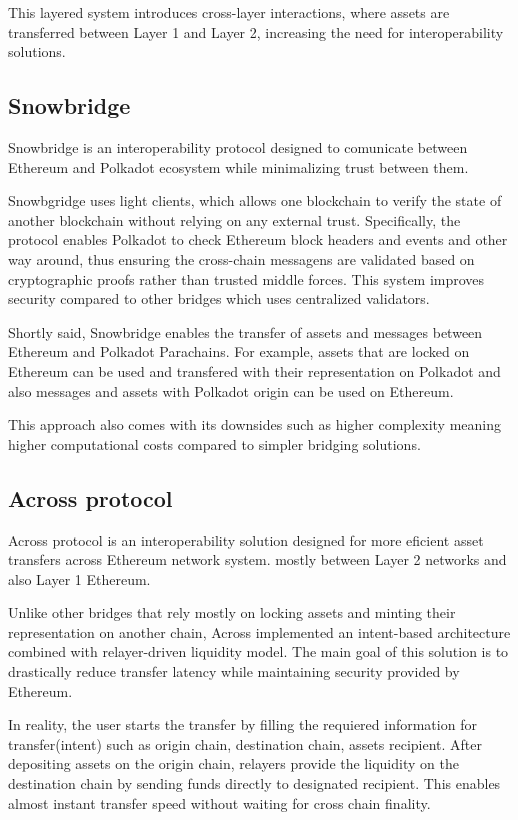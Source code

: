 \documentclass[conference]{IEEEtran}
\begin{document}
This layered system introduces cross-layer interactions, where assets are transferred between Layer 1 and Layer 2, increasing the need for interoperability solutions.
\subsection{Snowbridge}

Snowbridge is an interoperability protocol designed to comunicate between Ethereum and Polkadot ecosystem while minimalizing trust between them. 

Snowbgridge uses light clients, which allows one blockchain to verify the state of another blockchain without relying on any external trust. Specifically, the protocol enables Polkadot to check Ethereum block headers and events and other way around, thus ensuring the cross-chain messagens are validated based on cryptographic proofs rather than trusted middle forces. This system improves security compared to other bridges which uses centralized validators.

Shortly said, Snowbridge enables the transfer of assets and messages between Ethereum and Polkadot Parachains. For example, assets that are locked on Ethereum can be used and transfered with their representation on Polkadot and also messages and assets with Polkadot origin can be used on Ethereum. 

This approach also comes with its downsides such as higher complexity meaning higher computational costs compared to simpler bridging solutions.


\subsection{Across protocol}
Across protocol is an interoperability solution designed for more eficient asset transfers across Ethereum network system. mostly between Layer 2 networks and also Layer 1 Ethereum.

Unlike other bridges that rely mostly on locking assets and minting their representation on another chain, Across implemented an intent-based architecture combined with relayer-driven liquidity model. The main goal of this solution is to drastically reduce transfer latency while maintaining security provided by Ethereum.

In reality, the user starts the transfer by filling the requiered information for transfer(intent) such as origin chain, destination chain, assets recipient. After depositing assets on the origin chain, relayers provide the liquidity on the destination chain by sending funds directly to designated recipient. This enables almost instant transfer speed without waiting for cross chain finality. 
\end{document}
